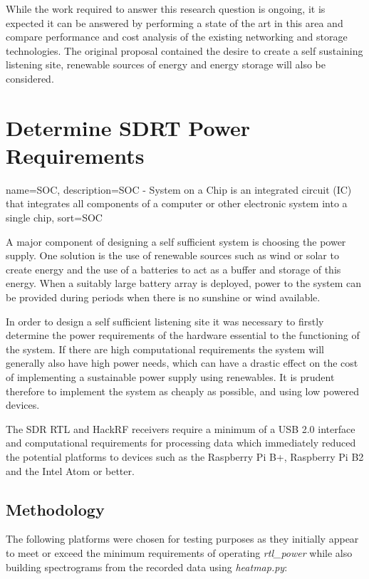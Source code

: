 \documentclass[runningheads,a4paper]{llncs}
\begin{document}
While the work required to answer this research question is ongoing, it is expected it can be answered by performing a state of the art in this area and compare performance and cost analysis of the existing networking and storage technologies. The original proposal contained the desire to create a self sustaining listening site, renewable sources of energy and energy storage will also be considered.


\section*{Determine SDRT Power Requirements}

{
  name={SOC},
  description={SOC - System on a Chip is an integrated circuit (IC) that integrates all components of a computer or other electronic system into a single chip},
  sort=SOC
}

A major component of designing a self sufficient system is choosing the power supply. One solution is the use of renewable sources such as wind or solar to create energy and the use of a batteries to act as a buffer and storage of this energy. When a suitably large battery array is deployed, power to the system can be provided during periods when there is no sunshine or wind available.

In order to design a self sufficient listening site it was necessary to firstly determine the power requirements of the hardware essential to the functioning of the system. If there are high computational requirements the system will generally also have high power needs, which can have a drastic effect on the cost of implementing a sustainable power supply using renewables. It is prudent therefore to implement the system as cheaply as possible, and using low powered devices.

The SDR RTL and HackRF receivers require a minimum of a USB 2.0 interface and computational requirements for processing data which immediately reduced the potential platforms to devices such as the Raspberry Pi B+, Raspberry Pi B2 and the Intel Atom or better.


\subsection*{Methodology}
The following platforms were chosen for testing purposes as they initially appear to meet or exceed the minimum requirements of operating \textit{rtl\_power} while also building spectrograms from the recorded data using \textit{heatmap.py}:
\end{document}
